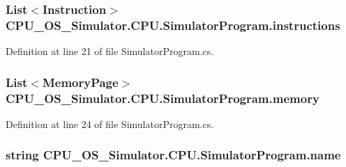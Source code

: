 \subsubsection[{instructions}]{\setlength{\rightskip}{0pt plus 5cm}List$<${\bf Instruction}$>$ C\+P\+U\+\_\+\+O\+S\+\_\+\+Simulator.\+C\+P\+U.\+Simulator\+Program.\+instructions\hspace{0.3cm}{\ttfamily [private]}}\label{class_c_p_u___o_s___simulator_1_1_c_p_u_1_1_simulator_program_a30b501e0b2d012212077059be49857cf}


Definition at line 21 of file Simulator\+Program.\+cs.

\hypertarget{class_c_p_u___o_s___simulator_1_1_c_p_u_1_1_simulator_program_a402e53ae5daf1b6be0d5b7b705091c9c}{}
\subsubsection[{memory}]{\setlength{\rightskip}{0pt plus 5cm}List$<${\bf Memory\+Page}$>$ C\+P\+U\+\_\+\+O\+S\+\_\+\+Simulator.\+C\+P\+U.\+Simulator\+Program.\+memory\hspace{0.3cm}{\ttfamily [private]}}\label{class_c_p_u___o_s___simulator_1_1_c_p_u_1_1_simulator_program_a402e53ae5daf1b6be0d5b7b705091c9c}


Definition at line 24 of file Simulator\+Program.\+cs.

\hypertarget{class_c_p_u___o_s___simulator_1_1_c_p_u_1_1_simulator_program_ad4797b5d81ceb01cd4207a97b7af36c5}{}
\subsubsection[{name}]{\setlength{\rightskip}{0pt plus 5cm}string C\+P\+U\+\_\+\+O\+S\+\_\+\+Simulator.\+C\+P\+U.\+Simulator\+Program.\+name\hspace{0.3cm}{\ttfamily [private]}}\label{class_c_p_u___o_s___simulator_1_1_c_p_u_1_1_simulator_program_ad4797b5d81ceb01cd4207a97b7af36c5}


